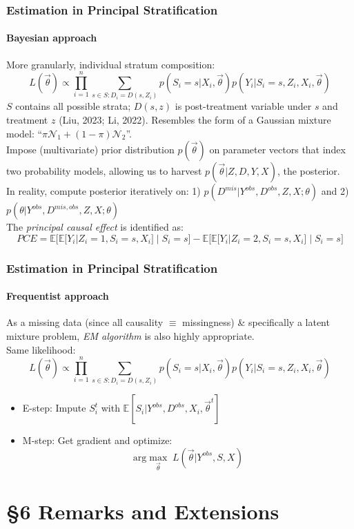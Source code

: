 \documentclass[10pt]{beamer}
\newcommand{\expect}{\mathbb{E}}
\newcommand{\zuo}{\Big[}
\newcommand{\you}{\Big ]}
\newcommand{\given}{\;|\;}
\begin{document}
\begin{frame}
\small  
\frametitle{Estimation in Principal Stratification}
\framesubtitle{Bayesian approach}
More granularly, individual stratum composition:
 $$
 L(\vec{\theta })\propto \prod^n_{i=1}\sum_{s\in S:D_i=D(s,Z_i)}p(S_i=s|X_i,\vec{\theta})p(Y_i|S_i=s,Z_i, X_i,\vec{\theta })
 $$
$S$ contains all possible strata; $D(s,z)$ is post-treatment variable under $s$ and treatment $z$ (Liu, 2023; Li, 2022). Resembles the form of a Gaussian mixture model: ``$\pi\mathcal{N}_1 + (1-\pi)\mathcal{N}_2$''.\\
\vspace{0.5\baselineskip}
Impose (multivariate) prior distribution $p(\vec{\theta})$ on parameter vectors that index two probability models, allowing us to harvest $p(\vec{\theta}|Z,D,Y,X)$, the posterior. \\
\vspace{0.5\baselineskip}
In reality,  compute posterior iteratively on: 1) $p(D^{mis}|Y^{obs},D^{obs}, Z,X;\theta)$ and 2) $p(\theta| Y^{obs},D^{mis,obs}, Z,X;\theta)$
\\
\vspace{0.5\baselineskip}
The \emph{principal causal effect} is identified as:
$$
PCE=\expect\zuo \expect[Y_i|Z_i=1,S_i=s,X_i]\given S_i=s\you-\expect\zuo \expect[Y_i|Z_i=2,S_i=s,X_i]\given S_i=s\you
$$
\end{frame}


\begin{frame}
\small 
\frametitle{Estimation in Principal Stratification}
\framesubtitle{Frequentist approach}
As a missing data (since all causality $\equiv$ missingness) \& specifically a latent mixture problem, \emph{EM algorithm} is also highly appropriate. \\
Same likelihood:
 $$
 L(\vec{\theta })\propto \prod^n_{i=1}\sum_{s\in S:D_i=D(s,Z_i)}p(S_i=s|X_i,\vec{\theta})p(Y_i|S_i=s,Z_i, X_i,\vec{\theta })
 $$
 \begin{itemize}
 	\item E-step: Impute $S_i^{t}$ with $\expect[S_i|Y^{obs}, D^{obs},X_i,\vec{\theta} ^t]$
 	\item M-step: Get gradient and optimize:
	$$
	\text{arg}\max_{\vec{\theta}}\; L(\vec{\theta}|Y^{obs}, S,X)
	$$
 \end{itemize}
\end{frame}




\section{\S 6 Remarks and Extensions} 
\end{document}
